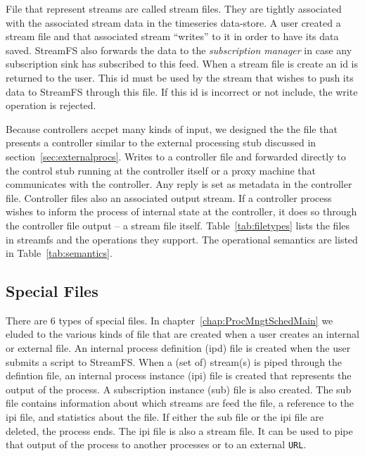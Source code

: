 File that represent streams are called stream files.  They are tightly associated with the associated stream data in the timeseries data-store.
A user created a stream file and that associated stream ``writes'' to it in order to have its data saved.  StreamFS also forwards the
data to the \emph{subscription manager} in case any subscription sink has subscribed to this feed.  When a stream file is create an id is 
returned to the user.  This id must be used by the stream that wishes to push its data to StreamFS through this file.  If this id is incorrect
or not include, the write operation is rejected.

Because controllers accpet many kinds of input, we designed the the file that presents a controller similar to the external processing stub discussed
in section~\ref{sec:externalprocs}.  Writes to a controller file and forwarded directly to the control stub running at the controller itself or a proxy
machine that communicates with the controller.  Any reply is set as metadata in the controller file.  Controller files also an associated output stream.
If a controller process wishes to inform the process of internal state at the controller, it does so through the controller file output --
a stream file itself.  Table~\ref{tab:filetypes} lists the files in streamfs and the operations they support.  The operational semantics
are listed in Table~\ref{tab:semantics}.



\subsection{Special Files}
There are 6 types of special files.  In chapter~\ref{chap:ProcMngtSchedMain} we eluded to the various kinds of file that are created
when a user creates an internal or external file.  An internal process definition (ipd) file is created when the user
submits a script to StreamFS.  When a (set of) stream(s) is piped through the defintion file, an internal process instance (ipi) file
is created that represents the output of the process.  A subscription instance (sub) file is also created.  The sub file contains
information about which streams are feed the file, a reference to the ipi file, and statistics about the file.  If either
the sub file or the ipi file are deleted, the process ends.  The ipi file is also a stream file.  It can be used to pipe that
output of the process to another processes or to an external \texttt{URL}.

